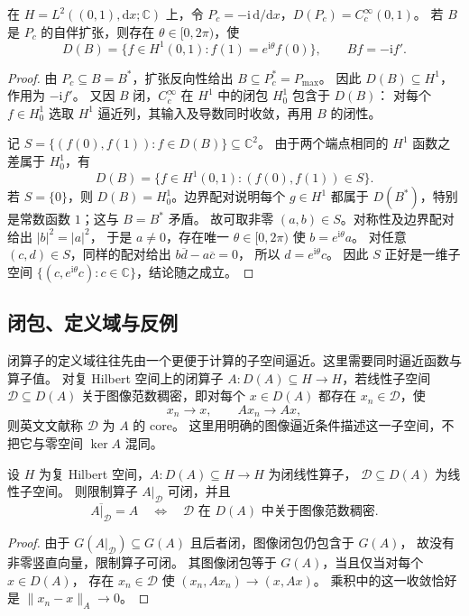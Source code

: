 \begin{corollary}[测试函数算子的全部自伴扩张]
\label{b1:cor:29-derivative-extensions}
在 \(H=L^2((0,1),\mathrm dx;\mathbb C)\) 上，令
\(P_c=-\mathrm i\,\mathrm d/\mathrm dx\)，\(D(P_c)=C_c^\infty(0,1)\)。
若 \(B\) 是 \(P_c\) 的自伴扩张，则存在 \(\theta\in[0,2\pi)\)，使
\[
 D(B)=\{f\in H^1(0,1):f(1)=e^{\mathrm i\theta}f(0)\},
 \qquad Bf=-\mathrm if'.
\]
\end{corollary}
\begin{proof}
由 \(P_c\subseteq B=B^*\)，扩张反向性给出 \(B\subseteq P_c^*=P_{\max}\)。
因此 \(D(B)\subseteq H^1\)，作用为 \(-\mathrm if'\)。
又因 \(B\) 闭，\(C_c^\infty\) 在 \(H^1\) 中的闭包 \(H_0^1\) 包含于 \(D(B)\)：
对每个 \(f\in H_0^1\) 选取 \(H^1\) 逼近列，其输入及导数同时收敛，再用 \(B\) 的闭性。

记 \(S=\{(f(0),f(1)):f\in D(B)\}\subseteq\mathbb C^2\)。
由于两个端点相同的 \(H^1\) 函数之差属于 \(H_0^1\)，有
\[
 D(B)=\{f\in H^1(0,1):(f(0),f(1))\in S\}.
\]
若 \(S=\{0\}\)，则 \(D(B)=H_0^1\)。边界配对说明每个 \(g\in H^1\) 都属于
\(D(B^*)\)，特别是常数函数 \(1\)；这与 \(B=B^*\) 矛盾。
故可取非零 \((a,b)\in S\)。对称性及边界配对给出 \(|b|^2=|a|^2\)，
于是 \(a\ne0\)，存在唯一 \(\theta\in[0,2\pi)\) 使 \(b=e^{\mathrm i\theta}a\)。
对任意 \((c,d)\in S\)，同样的配对给出 \(b\overline d-a\overline c=0\)，
所以 \(d=e^{\mathrm i\theta}c\)。
因此 \(S\) 正好是一维子空间 \(\{(c,e^{\mathrm i\theta}c):c\in\mathbb C\}\)，结论随之成立。
\end{proof}

\subsection{闭包、定义域与反例}
\label{b1:subsec:290704}

闭算子的定义域往往先由一个更便于计算的子空间逼近。这里需要同时逼近函数与算子值。
对复 Hilbert 空间上的闭算子 \(A:D(A)\subseteq H\to H\)，若线性子空间
\(\mathcal D\subseteq D(A)\) 关于图像范数稠密，即对每个 \(x\in D(A)\) 都存在
\(x_n\in\mathcal D\)，使
\[
 x_n\to x,\qquad Ax_n\to Ax,
\]
则英文文献称 \(\mathcal D\) 为 \(A\) 的 core。
这里用明确的图像逼近条件描述这一子空间，不把它与零空间 \(\ker A\) 混同。

\begin{proposition}[限制算子的闭包判据]
\label{b1:prop:29-core-criterion}
设 \(H\) 为复 Hilbert 空间，\(A:D(A)\subseteq H\to H\) 为闭线性算子，
\(\mathcal D\subseteq D(A)\) 为线性子空间。
则限制算子 \(A|_{\mathcal D}\) 可闭，并且
\[
 \overline{A|_{\mathcal D}}=A
 \quad\Longleftrightarrow\quad
 \mathcal D\text{ 在 }D(A)\text{ 中关于图像范数稠密}.
\]
\end{proposition}
\begin{proof}
由于 \(G(A|_{\mathcal D})\subseteq G(A)\) 且后者闭，图像闭包仍包含于 \(G(A)\)，
故没有非零竖直向量，限制算子可闭。
其图像闭包等于 \(G(A)\)，当且仅当对每个 \(x\in D(A)\)，
存在 \(x_n\in\mathcal D\) 使 \((x_n,Ax_n)\to(x,Ax)\)。
乘积中的这一收敛恰好是 \(\|x_n-x\|_A\to0\)。
\end{proof}

